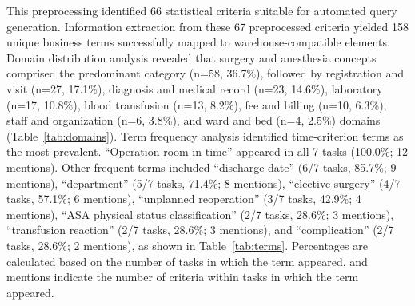 \documentclass[10pt,twocolumn]{article}
\begin{document}
\begin{figure}[!t]
\end{figure}

This preprocessing identified 66 statistical criteria suitable for automated
query generation. Information extraction from these 67 preprocessed criteria
yielded 158 unique business terms successfully mapped to warehouse-compatible
elements. Domain distribution analysis revealed that surgery and anesthesia
concepts comprised the predominant category (n=58, 36.7\%), followed by registration and visit (n=27, 17.1\%), diagnosis and medical record (n=23, 14.6\%), laboratory (n=17, 10.8\%), blood transfusion (n=13, 8.2\%), fee and billing (n=10, 6.3\%), staff and organization (n=6, 3.8\%), and ward and bed (n=4, 2.5\%) domains (Table~\ref{tab:domains}). Term frequency analysis
identified time-criterion terms as the most prevalent. ``Operation room-in
time'' appeared in all 7 tasks (100.0\%; 12 mentions). Other frequent terms
included ``discharge date'' (6/7 tasks, 85.7\%; 9 mentions), ``department'' (5/7 tasks, 71.4\%; 8 mentions), ``elective surgery'' (4/7 tasks, 57.1\%; 6 mentions), ``unplanned reoperation'' (3/7 tasks, 42.9\%; 4 mentions), ``ASA
physical status classification'' (2/7 tasks, 28.6\%; 3 mentions), ``transfusion
reaction'' (2/7 tasks, 28.6\%; 3 mentions), and ``complication'' (2/7 tasks, 28.6\%; 2 mentions), as shown in Table~\ref{tab:terms}. Percentages are
calculated based on the number of tasks in which the term appeared, and mentions
indicate the number of criteria within tasks in which the term appeared.
\end{document}
